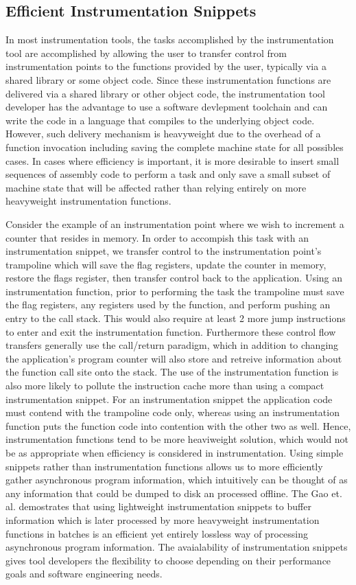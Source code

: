 \subsection{Efficient Instrumentation Snippets}

In most instrumentation tools, the tasks accomplished by the instrumentation tool are accomplished by allowing the user
to transfer control from instrumentation points to the functions provided by the user, typically
via a shared library or some object code. Since these instrumentation functions are delivered via a shared library or other
object code, the instrumentation tool developer has the advantage to use a software devlepment toolchain and can
write the code in a language that compiles to the underlying object code. However, such delivery mechanism is heavyweight due to 
the overhead of a function invocation including saving the complete machine state for all possibles cases. In cases where
efficiency is important, it is more desirable to insert small sequences of assembly code to perform a task and only
save a small subset of machine state that will be affected rather than relying entirely on more heavyweight instrumentation functions.

Consider the example of an instrumentation point where we wish to increment a counter that resides in memory. 
In order to accompish this task with an instrumentation snippet, we transfer control to the
instrumentation point's trampoline which will save the flag registers, update the counter in memory, restore
the flags register, then transfer control back to the application. Using an instrumentation function, prior to performing
the task the trampoline must save the flag registers, any registers used by the function, and perform pushing an entry to the call stack.
This would also require at least 2 more jump instructions to enter and exit the instrumentation function. 
Furthermore these control flow transfers generally use the call/return paradigm, which in addition to changing the
application's program counter will also store and retreive information about the function call site onto the stack. 
The use of the instrumentation function is also more likely to pollute the instruction cache more than using a compact
instrumentation snippet. For an instrumentation snippet the application code must contend with the trampoline code
only, whereas using an instrumentation function puts the function code into contention with the other two as well. Hence, 
instrumentation functions tend to be more heaviweight solution, which would not be as appropriate when efficiency is considered
in instrumentation. Using simple snippets rather than instrumentation functions allows us to more efficiently gather 
asynchronous program information, which intuitively can be thought of as any information that could be dumped to
disk an processed offline. The Gao et. al. \cite{gao2005aliter} demostrates that using lightweight instrumentation snippets to buffer information
which is later processed by more heavyweight instrumentation functions in batches is an efficient yet entirely lossless way of processing asynchronous
program information. The avaialability of instrumentation snippets gives tool developers the flexibility to choose 
depending on their performance goals and software engineering needs.

